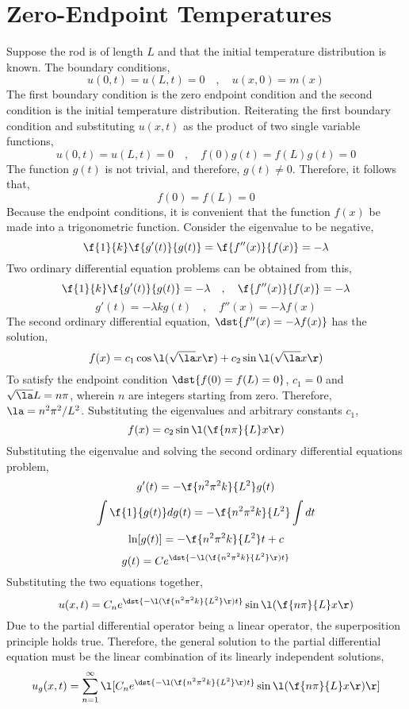 \section{Zero-Endpoint Temperatures}
\begin{comment} 
\end{comment}
Suppose the rod is of length $L$ and that the initial temperature distribution is known. The boundary conditions,
$$u(0,t) = u(L,t) = 0\quad,\quad u(x,0) = m(x)$$The first boundary condition is the zero endpoint condition and the second condition is the initial temperature distribution. Reiterating the first boundary condition and substituting $u(x,t)$ as the product of two single variable functions,
$$u(0,t) = u(L,t) = 0\quad,\quad f(0)g(t) = f(L)g(t) = 0$$
The function $g(t)$ is not trivial, and therefore, $g(t) \neq 0$. Therefore, it follows that,
$$f(0) = f(L) = 0$$Because the endpoint conditions, it is convenient that the function $f(x)$ be made into a trigonometric function. Consider the eigenvalue to be negative,
$$\f{1}{k}\f{g'(t)}{g(t)} = \f{f''(x)}{f(x)} = -\lambda$$
Two ordinary differential equation problems can be obtained from this,
$$\f{1}{k}\f{g'(t)}{g(t)} = -\lambda \quad,\quad \f{f''(x)}{f(x)} = -\lambda$$
$$g'(t) = -\lambda kg(t) \quad,\quad f''(x) = -\lambda f(x)$$                               
The second ordinary differential equation, $\dst{f''(x) = -\lambda f(x)}$ has the solution,
$$f(x) = c_1\cos\l(\sqrt{\la}x\r) + c_2\sin\l(\sqrt{\la}x\r)$$To satisfy the endpoint condition $\dst{f(0) = f(L) = 0}$, $c_1 = 0$ and $\sqrt{\la}L = n\pi$, wherein $n$ are integers starting from zero. Therefore, $\la = n^2\pi^2/L^2$. Substituting the eigenvalues and arbitrary constants $c_1$,
$$f(x) = c_2\sin\l(\f{n\pi}{L} x\r)$$
Substituting the eigenvalue and solving the second ordinary differential equations problem,
$$g'(t) = -\f{n^2\pi^2k}{L^2}g(t)$$
$$\int\f{1}{g(t)}dg(t) = -\f{n^2\pi^2k}{L^2}\int dt$$
$$\ln[g(t)] = -\f{n^2\pi^2k}{L^2}t + c$$
$$g(t) = Ce^{\dst{-\l(\f{n^2\pi^2k}{L^2}\r)t}}$$
Substituting the two equations together,
$$u(x,t) = C_ne^{\dst{-\l(\f{n^2\pi^2k}{L^2}\r)t}}\sin\l(\f{n\pi}{L} x\r)$$
Due to the partial differential operator being a linear operator, the superposition principle holds true. Therefore, the general solution to the partial differential equation must be the linear combination of its linearly independent solutions,
$$u_g(x,t) = \sum^{\infty}_{n=1}\l[C_ne^{\dst{-\l(\f{n^2\pi^2k}{L^2}\r)t}}\sin\l(\f{n\pi}{L} x\r)\r]$$
